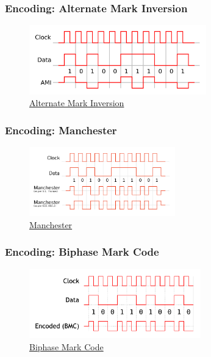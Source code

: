   \begin{frame}
    \frametitle{Encoding: Alternate Mark Inversion}
    \begin{figure}[t]
      \centering
      \includegraphics[height=3cm]{./imgs/ami.pdf}
      \caption{\color{blue}\href{https://upload.wikimedia.org/wikipedia/commons/b/b6/Ami_encoding.svg}{Alternate Mark Inversion}}
      \label{fig:ami}
    \end{figure}
  \end{frame}
  \begin{frame}
    \frametitle{Encoding: Manchester}
    \begin{figure}[t]
      \centering
      \includegraphics[height=3cm]{./imgs/manchester.png}
      \caption{\color{blue}\href{https://upload.wikimedia.org/wikipedia/commons/thumb/9/90/Manchester_encoding_both_conventions.svg/771px-Manchester_encoding_both_conventions.svg.png}{Manchester}}
      \label{fig:manchester}
    \end{figure}
  \end{frame}
  \begin{frame}
    \frametitle{Encoding: Biphase Mark Code}
    \begin{figure}[t]
      \centering
      \includegraphics[height=3cm]{./imgs/bmc.pdf}
      \caption{\color{blue}\href{https://upload.wikimedia.org/wikipedia/commons/c/cb/Biphase_Mark_Code.svg}{Biphase Mark Code}}
      \label{fig:bmc}
    \end{figure}
  \end{frame}
